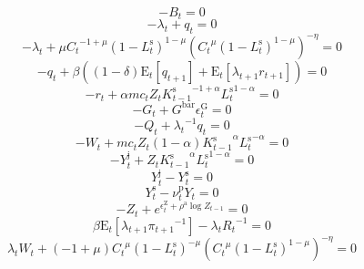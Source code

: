 \begin{equation}
-B_{t} = 0
\end{equation}
\begin{equation}
-\lambda_{t} + q_{t} = 0
\end{equation}
\begin{equation}
-\lambda_{t} + {\mu} {{C_{t}}^{-1 + \mu}} {\left(1 - L^{\mathrm{s}}_{t}\right)^{1 - \mu}} {\left({{C_{t}}^{\mu}} {\left(1 - L^{\mathrm{s}}_{t}\right)^{1 - \mu}}\right)^{-\eta}} = 0
\end{equation}
\begin{equation}
-q_{t} + {\beta} \left(\left(1 - \delta\right) {\mathrm{E}_{t}\left[q_{t+1}\right]} + \mathrm{E}_{t}\left[{\lambda_{t+1}} {r_{t+1}}\right]\right) = 0
\end{equation}
\begin{equation}
-r_{t} + {\alpha} {{m\!c}_{t}} {Z_{t}} {{K^{\mathrm{s}}_{t-1}}^{-1 + \alpha}} {{L^{\mathrm{s}}_{t}}^{1 - \alpha}} = 0
\end{equation}
\begin{equation}
-G_{t} + {G^{\mathrm{bar}}} {\epsilon^{\mathrm{G}}_{t}} = 0
\end{equation}
\begin{equation}
-Q_{t} + {\lambda_{t}}^{-1} {q_{t}} = 0
\end{equation}
\begin{equation}
-W_{t} + {{m\!c}_{t}} {Z_{t}} \left(1 - \alpha\right) {{K^{\mathrm{s}}_{t-1}}^{\alpha}} {{L^{\mathrm{s}}_{t}}^{-\alpha}} = 0
\end{equation}
\begin{equation}
-Y^{\mathrm{j}}_{t} + {Z_{t}} {{K^{\mathrm{s}}_{t-1}}^{\alpha}} {{L^{\mathrm{s}}_{t}}^{1 - \alpha}} = 0
\end{equation}
\begin{equation}
Y^{\mathrm{j}}_{t} - Y^{\mathrm{s}}_{t} = 0
\end{equation}
\begin{equation}
Y^{\mathrm{s}}_{t} - {\nu^{\mathrm{p}}_{t}} {Y_{t}} = 0
\end{equation}
\begin{equation}
-Z_{t} + e^{\epsilon^{\mathrm{Z}}_{t} + {\rho^{\mathrm{a}}} {\log{Z_{t-1}}}} = 0
\end{equation}
\begin{equation}
{\beta} {\mathrm{E}_{t}\left[{\lambda_{t+1}} {\pi_{t+1}}^{-1}\right]} - {\lambda_{t}} {R_{t}}^{-1} = 0
\end{equation}
\begin{equation}
{\lambda_{t}} {W_{t}} + \left(-1 + \mu\right) {{C_{t}}^{\mu}} {\left(1 - L^{\mathrm{s}}_{t}\right)^{-\mu}} {\left({{C_{t}}^{\mu}} {\left(1 - L^{\mathrm{s}}_{t}\right)^{1 - \mu}}\right)^{-\eta}} = 0
\end{equation}
